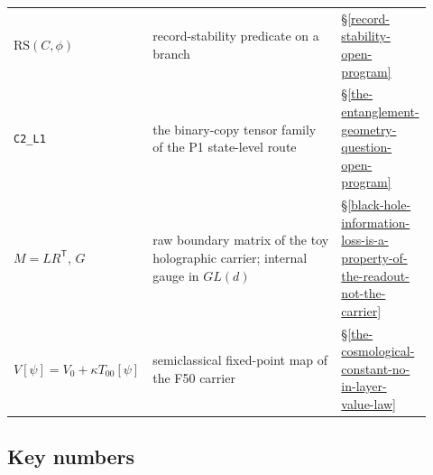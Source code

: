 \documentclass[11pt]{article}
\theoremstyle{definition}
\begin{document}
\begin{center}
\begin{longtable}[]{@{}p{0.27\linewidth}p{0.55\linewidth}p{0.1\linewidth}@{}}
\(\mathrm{RS}(C,\phi)\) & record-stability predicate on a branch & \S\ref{record-stability-open-program}\\
\texttt{C2\_L1} & the binary-copy tensor family of the P1 state-level route & \S\ref{the-entanglement-geometry-question-open-program}\\
\(M=LR^{\mathsf T}\), \(G\) & raw boundary matrix of the toy holographic carrier; internal gauge in \(GL(d)\) & \S\ref{black-hole-information-loss-is-a-property-of-the-readout-not-the-carrier}\\
\(V[\psi]=V_0+\kappa T_{00}[\psi]\) & semiclassical fixed-point map of the F50 carrier & \S\ref{the-cosmological-constant-no-in-layer-value-law}\\
\bottomrule
\end{longtable}
\end{center}

\subsection{Key numbers}\label{the-headline-numbers-single-reference-row}
\end{document}
